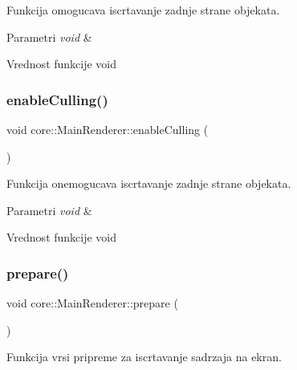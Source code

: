 Funkcija omogucava iscrtavanje zadnje strane objekata. 


\begin{DoxyParams}{Parametri}
{\em void} & \\
\hline
\end{DoxyParams}
\begin{DoxyReturn}{Vrednost funkcije}
void 
\end{DoxyReturn}
\mbox{\label{classcore_1_1MainRenderer_abf659aace3015f29db1c3ea9561fff2f}} 
\subsubsection{\texorpdfstring{enable\+Culling()}{enableCulling()}}
{\footnotesize\ttfamily void core\+::\+Main\+Renderer\+::enable\+Culling (\begin{DoxyParamCaption}{ }\end{DoxyParamCaption})}



Funkcija onemogucava iscrtavanje zadnje strane objekata. 


\begin{DoxyParams}{Parametri}
{\em void} & \\
\hline
\end{DoxyParams}
\begin{DoxyReturn}{Vrednost funkcije}
void 
\end{DoxyReturn}
\mbox{\label{classcore_1_1MainRenderer_a8e8be03c3b1f51ce0721cf52aa8f0f3c}} 
\subsubsection{\texorpdfstring{prepare()}{prepare()}}
{\footnotesize\ttfamily void core\+::\+Main\+Renderer\+::prepare (\begin{DoxyParamCaption}\item[{void}]{ }\end{DoxyParamCaption})}



Funkcija vrsi pripreme za iscrtavanje sadrzaja na ekran. 


